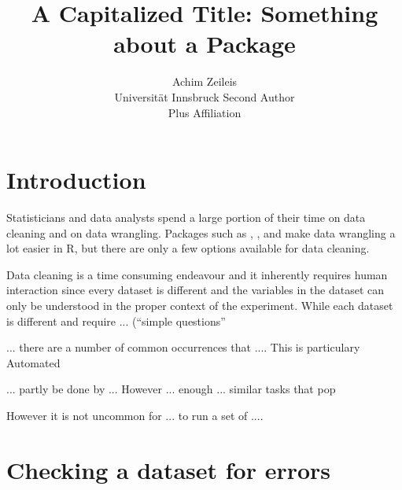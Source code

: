 \documentclass[article]{jss}
\author{Achim Zeileis\\Universit\"at Innsbruck \And
        Second Author\\Plus Affiliation}
\title{A Capitalized Title: Something about a Package \pkg{cleanR}}
\begin{document}
\section{Introduction}
Statisticians and data analysts spend a large portion of their time on
data cleaning and on data wrangling. Packages such as \pkg{}, \pkg{},
and \pkg{} make data wrangling a lot easier in R, but there are only a
few options available for data cleaning.


Data cleaning is a time consuming endeavour and it inherently requires
human interaction since every dataset is different and the variables
in the dataset can only be understood in the proper context of the
experiment. While each dataset is different and require
... (``simple questions''

... there are a number of common occurrences that .... This is particulary
Automated


... partly be done by ... However ... enough ... similar tasks that
pop


However it is not uncommon for ... to run a set of ....


\section{Checking a dataset for errors}
\end{document}

